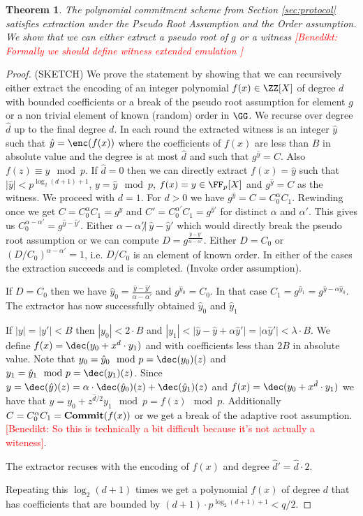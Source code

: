 \documentclass{article}
\newtheorem{theorem}{Theorem}
\newcommand{\benedikt}[1]{{\textcolor{red}{[Benedikt: #1]}}}
\newcommand{\benedikt}[1]{}
\begin{document}
\begin{theorem}
	The polynomial commitment scheme from Section \ref{sec:protocol} satisfies extraction under the Pseudo Root Assumption and the Order assumption. We show that we can either extract a pseudo root of $g$ or a witness \benedikt{Formally we should define witness extended emulation }
\end{theorem}
\begin{proof}
(SKETCH)
We prove the statement by showing that we can recursively either extract the encoding of an integer polynomial $f(x) \in \ZZ[X]$ of degree $d$ with bounded coefficients or a break of the pseudo root assumption for element $g$ or a non trivial element of known (random) order in $\GG$. We recurse over degree $\hat{d}$ up to the final degree $d$.
In each round the extracted witness is an integer $\hat{y}$ such that $\hat{y}=\enc(f(x))$ where the coefficients of $f(x)$ are less than $B$ in absolute value and the degree is at most $\hat{d}$ and such that $g^{\hat{y}}=C$. Also $f(z) \equiv y \mod p$.
If $\hat{d}=0$ then we can directly extract $f(x)=\hat{y}$ such that $\vert \hat{y} \vert < p^{\log_2(d+1)+1}$, $y=\hat{y}\mod p$, $f(x)=y\in \FF_p[X]$ and $g^{\hat{y}}=C$ as the witness. We proceed with $d=1$.
For $d>0$ we have $g^{\hat{y}}=C=C_0^{\alpha}C_1$. Rewinding once we get 
 $C=C_0^{\alpha}C_1=g^{\hat{y}}$ and $C'=C_0^{\alpha'}C_1=g^{\hat{y}'}$ for distinct $\alpha$ and $\alpha'$. 
 This gives us $C_0^{\alpha-\alpha'}=g^{\hat{y}-\hat{y}'}$. 
 Either $\alpha-\alpha' \not|~ \hat{y}-\hat{y}' $ which would directly break the pseudo root assumption or we can compute $D=g^{\frac{\hat{y}-\hat{y}'}{\alpha-\alpha'}}$. Either $D=C_0$ or $(D/C_0)^{\alpha-\alpha'}=1$, i.e. $D/C_0$ is an element of known order. In either of the cases the extraction succeeds and is completed. (Invoke order assumption).
 
 If $D=C_0$ then we have $\hat{y}_0=\frac{\hat{y}-\hat{y}'}{\alpha-\alpha'}$ and
 $g^{\hat{y}_0}=C_0$. In that case $C_1=g^{\hat{y}_1}=g^{\hat{y}-\alpha\hat{y}_0}$. The extractor has now successfully obtained $\hat{y}_0$ and $\hat{y}_1$
 
 If $|y|=|y'|<B$ then $|y_0|<  2 \cdot B$ and $|y_1|<|\hat{y}-\hat{y}+\alpha\hat{y}'|=|\alpha \hat{y}'|<\lambda \cdot B$. 
 We define $f(x)=\dec(y_0+x^{d} \cdot y_1)$ and with coefficients less than $2B$ in absolute value. 
 Note that $y_0=\hat{y}_0 \mod p=\dec(y_0)(z)$ and $y_1=\hat{y}_1 \mod p=\dec(y_1)(z)$. Since $y=\dec(\hat{y})(z)=\alpha \cdot \dec(\hat{y}_0)(z)+\dec(\hat{y}_1)(z)$ and $f(x)=\dec(y_0+x^{\hat{d}} \cdot y_1)$ we have that $y=y_0 +z^{\hat{d}/2}y_1 \mod p=f(z) \mod p$.
 Additionally $C=C_0^{\alpha}C_1=\textbf{{Commit}}(f(x))$ or we get a break of the adaptive root assumption.\benedikt{So this is technically a bit difficult because it's not actually a witeness}.
 
 The extractor recuses with the encoding of $f(x)$ and degree $\hat{d}'=\hat{d}\cdot 2$.
 
 Repeating this $\log_2(d+1)$ times we get a polynomial $f(x)$ of degree $d$ that has coefficients that are bounded by $(d+1) \cdot p^{\log_2(d+1)+1} <q/2$. 
 


\end{proof}
\end{document}
